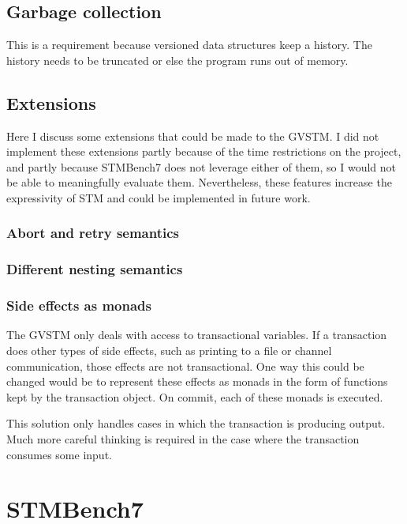 \documentclass[12pt,a4paper,oneside,openright]{report}
\begin{document}
\subsection{Garbage collection}
\label{sec:impl:garbage-collection}

This is a requirement because versioned data structures keep a
history. The history needs to be truncated or else the program runs
out of memory.

\subsection{Extensions}
\label{sec:impl:extensions}

Here I discuss some extensions that could be made to the GVSTM. I did
not implement these extensions partly because of the time restrictions
on the project, and partly because STMBench7 does not leverage either
of them, so I would not be able to meaningfully evaluate
them. Nevertheless, these features increase the expressivity of STM
and could be implemented in future work.

\subsubsection{Abort and retry semantics}
\label{sec:impl:abort-retry-semant}

\subsubsection{Different nesting semantics}
\label{sec:impl:diff-nest-semant}

\subsubsection{Side effects as monads}
\label{sec:impl:side-effects-as}

The GVSTM only deals with access to transactional variables. If a
transaction does other types of side effects, such as printing to a
file or channel communication, those effects are not
transactional. One way this could be changed would be to represent
these effects as monads in the form of functions kept by the
transaction object. On commit, each of these monads is executed.

This solution only handles cases in which the transaction is producing
output. Much more careful thinking is required in the case where the
transaction consumes some input.

\section{STMBench7}
\label{sec:impl:stmbench7}
\end{document}
